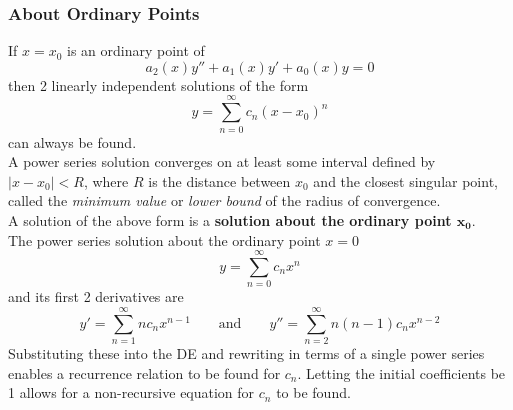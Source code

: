 \documentclass[12pt, A4]{article}
\begin{document}
			\subsubsection{About Ordinary Points}
				If \(x = x_0\) is an ordinary point of
					\[a_2(x)y'' + a_1(x)y' + a_0(x)y = 0\]
					then 2 linearly independent solutions of the form
					\[y = \sum_{n = 0}^\infty c_n(x - x_0)^n\]
					can always be found. \\
				A power series solution converges on at least some interval defined by \(|x - x_0| < R\), where \(R\) is the distance between \(x_0\) and the closest singular point, called the \textit{minimum value} or \textit{lower bound} of the radius of convergence. \\
				A solution of the above form is a \textbf{solution about the ordinary point \(\bm{x_0}\)}. \\
				The power series solution about the ordinary point \(x = 0\)
				\[\boxed{y = \sum_{n = 0}^\infty c_nx^n} \]
				and its first 2 derivatives are
				\[\boxed{
					y' = \sum_{n = 1}^\infty nc_nx^{n - 1} \qquad \text{and} \qquad
					y'' = \sum_{n = 2}^\infty n(n - 1)c_nx^{n - 2}
				}\]
				Substituting these into the DE and rewriting in terms of a single power series enables a recurrence relation to be found for \(c_n\). Letting the initial coefficients be 1 allows for a non-recursive equation for \(c_n\) to be found.
\end{document}
